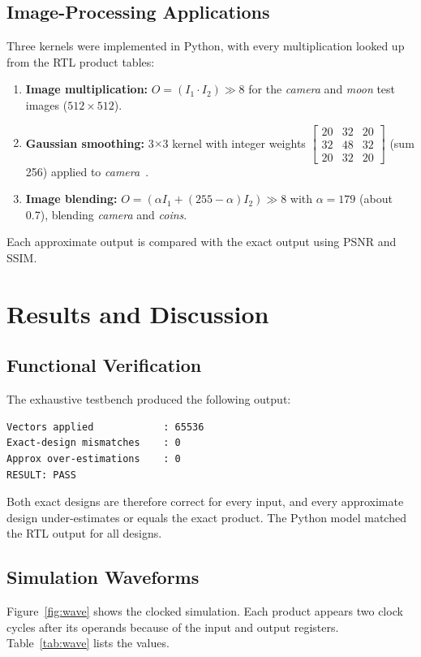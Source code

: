 \documentclass[12pt,a4paper,oneside]{report}
\begin{document}
\section{Image-Processing Applications}
Three kernels were implemented in Python, with every multiplication looked up from the RTL product tables:
\begin{enumerate}
\item \textbf{Image multiplication:} $O=(I_1\cdot I_2)\gg 8$ for the \emph{camera} and \emph{moon} test images ($512\times512$).
\item \textbf{Gaussian smoothing:} 3$\times$3 kernel with integer weights $\begin{bmatrix}20&32&20\\32&48&32\\20&32&20\end{bmatrix}$ (sum 256) applied to \emph{camera}~\cite{gonzalez2018dip}.
\item \textbf{Image blending:} $O=(\alpha I_1 + (255-\alpha) I_2)\gg 8$ with $\alpha=179$ (about 0.7), blending \emph{camera} and \emph{coins}.
\end{enumerate}
Each approximate output is compared with the exact output using PSNR and SSIM.

\chapter{Results and Discussion}

\section{Functional Verification}
The exhaustive testbench produced the following output:
\begin{lstlisting}[language={}, numbers=none, caption={Exhaustive testbench console output}]
Vectors applied            : 65536
Exact-design mismatches    : 0
Approx over-estimations    : 0
RESULT: PASS
\end{lstlisting}
Both exact designs are therefore correct for every input, and every approximate design under-estimates or equals the exact product. The Python model matched the RTL output for all designs.

\section{Simulation Waveforms}
Figure~\ref{fig:wave} shows the clocked simulation. Each product appears two clock cycles after its operands because of the input and output registers. Table~\ref{tab:wave} lists the values.
\end{document}
